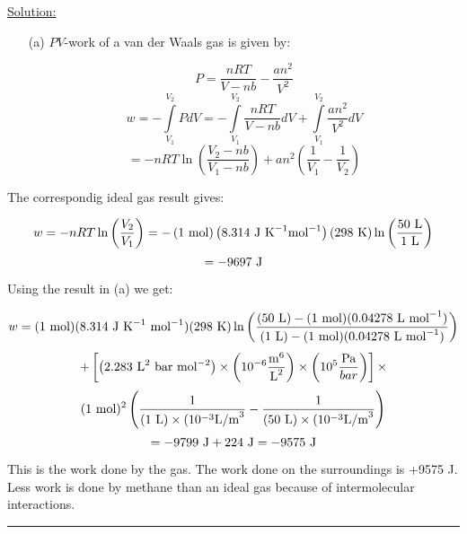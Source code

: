 \noindent
\underline{Solution:}\\

\begin{itemize}

\item[(a)] $PV$-work of a van der Waals gas is given by:

$$P = \frac{nRT}{V - nb} - \frac{an^2}{V^2}$$
$$w = -\int\limits_{V_1}^{V_2}PdV = -\int\limits_{V_1}^{V_2}\frac{nRT}{V - nb}dV + \int\limits_{V_1}^{V_2}\frac{an^2}{V^2}dV$$
$$ = -nRT\ln\left(\frac{V_2 - nb}{V_1 - nb}\right) + an^2\left(\frac{1}{V_1} - \frac{1}{V_2}\right)$$
\end{itemize}

\item[(b)] The correspondig ideal gas result gives:

$$w = -nRT\ln\left(\frac{V_2}{V_1}\right) = -\left(1\textnormal{ mol}\right)\left(8.314\textnormal{ J K}^{-1}\textnormal{mol}^{-1}\right)\left(298\textnormal{ K}\right)\ln\left(\frac{50\textnormal{ L}}{1\textnormal{ L}}\right)$$
$$ = -9697\textnormal{ J}$$

\item[(c)] Using the result in (a) we get:

$$w = (1\textnormal{ mol})(8.314\textnormal{ J K}^{-1}\textnormal{ mol}^{-1})(298\textnormal{ K})\ln\left(\frac{(50\textnormal{ L}) - (1\textnormal{ mol})(0.04278\textnormal{ L mol}^{-1})}{(1\textnormal{ L}) - (1\textnormal{ mol})(0.04278\textnormal{ L mol}^{-1})}\right)$$
$$ + \left[\left(2.283\textnormal{ L}^2\textnormal{ bar mol}^{-2}\right)\times\left(10^{-6}\frac{\textnormal{m}^6}{\textnormal{L}^2}\right)\times\left(10^5\frac{\textnormal{Pa}}{bar}\right)\right]\times$$
$$(1\textnormal{ mol})^2\left(\frac{1}{(1\textnormal{ L})\times(10^{-3}\textnormal{L/m}^3} - \frac{1}{(50\textnormal{ L})\times(10^{-3}\textnormal{L/m}^3}\right)$$
$$ = -9799\textnormal{ J} + 224\textnormal{ J} = -9575\textnormal{ J}$$

This is the work done by the gas. The work done on the surroundings is +9575 J. Less work is done by methane than an ideal gas because of intermolecular interactions.

\hrule\vspace{0.5cm}
